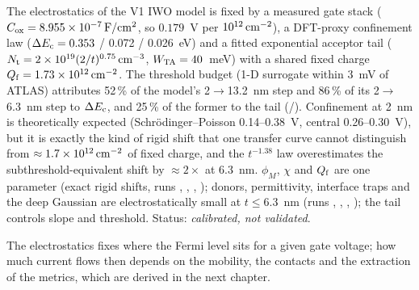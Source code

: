 \begin{keyresult}
The electrostatics of the V1 IWO model is fixed by a measured gate stack ($C_{\mathrm{ox}} = \SI{8.955e-7}{F/cm^2}$, so
$0.179$~V per $10^{12}\,\mathrm{cm}^{-2}$), a DFT-proxy confinement law ($\Delta E_{\mathrm{c}} = 0.353$ / 0.072 / 0.026~eV) and a fitted exponential
acceptor tail ($N_{\mathrm{t}} = 2\times10^{19}(2/t)^{0.75}\,\mathrm{cm}^{-3}$, $W_{\mathrm{TA}} = 40$~meV) with a shared fixed charge
$Q_{\mathrm{f}} = 1.73\times10^{12}\,\mathrm{cm}^{-2}$. The threshold budget (1-D surrogate within 3~mV of ATLAS) attributes 52\,\% of the model's
2$\rightarrow$13.2~nm step and 86\,\% of its 2$\rightarrow$6.3~nm step to $\Delta E_{\mathrm{c}}$, and 25\,\% of the former to the tail
(\evSURR/\evNUM). Confinement at 2~nm is theoretically expected (Schr\"odinger--Poisson 0.14--0.38~V, central 0.26--0.30~V),
but it is exactly the kind of rigid shift that one transfer curve cannot distinguish from $\approx1.7\times10^{12}\,\mathrm{cm}^{-2}$ of
fixed charge, and the $t^{-1.38}$ law overestimates the subthreshold-equivalent shift by $\approx2\times$ at 6.3~nm. $\phi_M$, $\chi$ and $Q_{\mathrm{f}}$ are one
parameter (exact rigid shifts, runs , , , ); donors, permittivity, interface traps and
the deep Gaussian are electrostatically small at $t\le6.3$~nm (runs , , , ); the tail
controls slope and threshold. Status: \emph{calibrated, not validated}.
\end{keyresult}

The electrostatics fixes where the Fermi level sits for a given gate voltage; how much current flows then depends on the
mobility, the contacts and the extraction of the metrics, which are derived in the next chapter.
